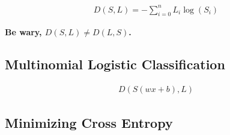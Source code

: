 \documentclass[english, 11pt]{article}
\begin{document}
	\begin{align*}
		D(S, L) = -\displaystyle\sum_{i=0}^{n}L_i \log(S_i)
	\end{align*}

	\textbf{Be wary, $D(S, L) \neq D(L, S)$.}

	\subsection{Multinomial Logistic Classification}

	\begin{align*}
		D(S(wx + b), L)
	\end{align*}

	\subsection{Minimizing Cross Entropy}
  
\end{document}
